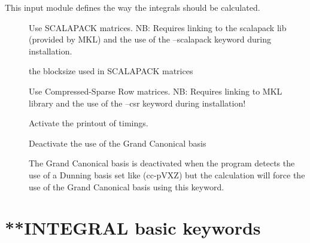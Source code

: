 This input module defines the way the integrals should be calculated.
\begin{description}

\item[] Use SCALAPACK matrices. \newline
NB: Requires linking to the scalapack lib (provided by MKL) and the use of the --scalapack keyword during installation.
\item[] the blocksize used in SCALAPACK matrices
\item[] Use Compressed-Sparse Row matrices. NB: Requires linking to MKL library and the use of the --csr keyword during installation!
\item[] Activate the printout of timings.
\item[] Deactivate the use of the Grand Canonical basis \cite{trilevel1, trilevel2}
\item[] The Grand Canonical basis \cite{trilevel1, trilevel2} is deactivated when the program
detects the use of a Dunning basis set like (cc-pVXZ) but the calculation will force the use of the Grand Canonical basis using this keyword.

\end{description}
\section{**INTEGRAL basic keywords}\label{sec:integral}

